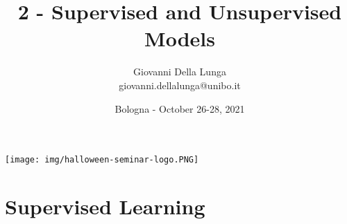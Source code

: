 \documentclass[11pt]{beamer}
\author{Giovanni Della Lunga\\{\footnotesize giovanni.dellalunga@unibo.it}}
\title{2 - Supervised and Unsupervised Models}
\subtitle{} %
\institute{Halloween Conference in Quantitative Finance}
\date{Bologna - October 26-28, 2021}
\begin{document}
\begin{frame}
\texttt{[image: img/halloween-seminar-logo.PNG]}
\end{frame}

\begin{frame}
\titlepage
\end{frame}

\AtBeginSubsection{\frame{\subsectionpage}}

\section{Supervised Learning}
\end{document}

